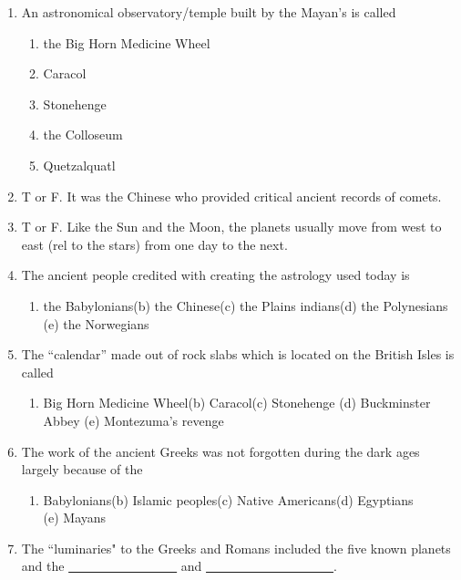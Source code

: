 \documentclass[12pt,thmsa]{article}
\begin{document}
\begin{enumerate}

\item An astronomical observatory/temple built by the Mayan's is called
\begin{enumerate}
        \item the Big Horn Medicine Wheel
        \item Caracol
        \item Stonehenge
        \item the Colloseum
        \item Quetzalquatl
\end{enumerate}

\item T or F. It was the Chinese who provided critical ancient records of comets.

\item T or F. Like the Sun and the Moon, the planets usually move from west to east (rel to the stars) from one day to the next.

\item  The ancient people credited with creating the astrology used today is

\begin{enumerate}
\item  the Babylonians\qquad (b) the Chinese\qquad (c) the Plains
indians\qquad (d) the Polynesians \qquad (e) the Norwegians
\end{enumerate}

\item  The ``calendar'' made out of rock slabs which is located on the
British Isles is called

\begin{enumerate}
\item  Big Horn Medicine Wheel\qquad (b) Caracol\qquad (c) Stonehenge\qquad
(d) Buckminster Abbey \qquad (e) Montezuma's revenge
\end{enumerate}

\item  The work of the ancient Greeks was not forgotten during the dark ages
largely because of the

\begin{enumerate}
\item  Babylonians\qquad (b) Islamic peoples\qquad (c) Native
Americans\qquad (d) Egyptians \\ (e) Mayans
\end{enumerate}

\item The ``luminaries" to the Greeks and Romans included the five
known planets and the \underline{~~~~~~~~~~~~~~~~~} and
\underline{~~~~~~~~~~~~~~~~~~~~}.

\end{enumerate}
\end{document}
